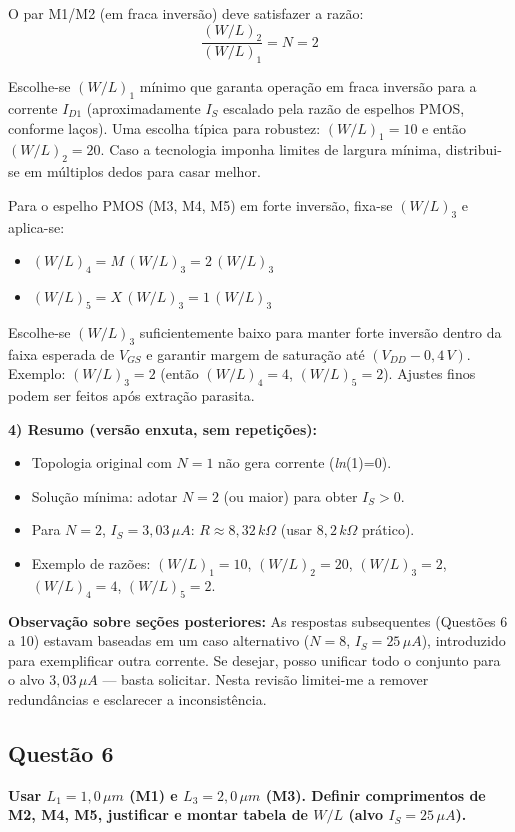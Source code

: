 ﻿\documentclass[12pt,a4paper]{article}
\begin{document}
O par M1/M2 (em fraca inversão) deve satisfazer a razão:
$$ \frac{(W/L)_2}{(W/L)_1} = N = 2 $$

Escolhe-se $(W/L)_1$ mínimo que garanta operação em fraca inversão para a corrente $I_{D1}$ (aproximadamente $I_S$ escalado pela razão de espelhos PMOS, conforme laços). Uma escolha típica para robustez: $(W/L)_1 = 10$ e então $(W/L)_2 = 20$. Caso a tecnologia imponha limites de largura mínima, distribui-se em múltiplos dedos para casar melhor.

Para o espelho PMOS (M3, M4, M5) em forte inversão, fixa-se $(W/L)_3$ e aplica-se:
\begin{itemize}
    \item $(W/L)_4 = M\,(W/L)_3 = 2\,(W/L)_3$
    \item $(W/L)_5 = X\,(W/L)_3 = 1\,(W/L)_3$
\end{itemize}

Escolhe-se $(W/L)_3$ suficientemente baixo para manter forte inversão dentro da faixa esperada de $V_{GS}$ e garantir margem de saturação até $(V_{DD} - 0{,}4\,V)$. Exemplo: $(W/L)_3 = 2$ (então $(W/L)_4 = 4$, $(W/L)_5 = 2$). Ajustes finos podem ser feitos após extração parasita.

	\textbf{4) Resumo (versão enxuta, sem repetições):}
\begin{itemize}
    \item Topologia original com $N=1$ não gera corrente (\textit{ln}(1)=0).
    \item Solução mínima: adotar $N=2$ (ou maior) para obter $I_S>0$.
    \item Para $N=2$, $I_S=3{,}03\,\mu A$: $R \approx 8{,}32\,k\Omega$ (usar $8{,}2\,k\Omega$ prático).
    \item Exemplo de razões: $(W/L)_1=10$, $(W/L)_2=20$, $(W/L)_3=2$, $(W/L)_4=4$, $(W/L)_5=2$.
\end{itemize}

	\textbf{Observação sobre seções posteriores:} As respostas subsequentes (Questões 6 a 10) estavam baseadas em um caso alternativo ($N=8$, $I_S=25\,\mu A$), introduzido para exemplificar outra corrente. Se desejar, posso unificar todo o conjunto para o alvo $3{,}03\,\mu A$ — basta solicitar. Nesta revisão limitei-me a remover redundâncias e esclarecer a inconsistência.

\subsection*{Questão 6}
\textbf{Usar $L_1 = 1,0\,\mu m$ (M1) e $L_3 = 2,0\,\mu m$ (M3). Definir comprimentos de M2, M4, M5, justificar e montar tabela de $W/L$ (alvo $I_S=25\,\mu A$).}
\end{document}
